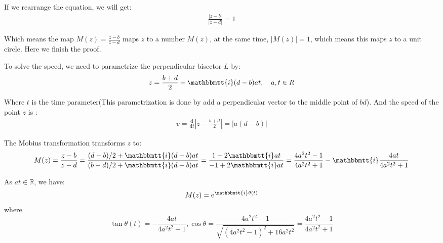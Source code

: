 \documentclass[]{ctexart}
\newcommand{\mi}{\mathbbmtt{i}}
\newcommand{\di}{\mathrm{d}}
\newcommand{\me}{\mathrm{e}}
\begin{document}
		If we rearrange the equation, we will get:
			\begin{equation*}
			\begin{aligned}
				\frac{|z-b|}{|z-d|}=1
			\end{aligned}
			\end{equation*}
			
		Which means the map $M(z)=\frac{z-b}{z-d}$ maps $z$ to a number $M(z)$, at the same time, $|M(z)|=1$, which means this maps $z$ to a unit circle. Here we finish the proof.
		
		To solve the speed, we need to parametrize the perpendicular bisector $L$ by:
		\begin{equation*}
		\begin{aligned}
		z=\frac{b+d}{2}+\mi (d-b)at,\quad a,t\in R
		\end{aligned}
		\end{equation*}
		
		Where $t$ is the time parameter(This parametrization is done by add a perpendicular vector to the middle point of $bd$). And the speed of the point $z$ is :
			\begin{equation*}
			\begin{aligned}
				v=\frac{\di }{\di t}\left|z-\frac{b+d}{2}\right|=|a(d-b)|
			\end{aligned}
			\end{equation*}
		
		The Mobius transformation transforms $z$ to:
			\begin{equation*}
			\begin{aligned}
				M(z)=\frac{z-b}{z-d}=\frac{(d-b)/2+\mi (d-b)at}{(b-d)/2+\mi (d-b)at}=\frac{1+2\mi at}{-1+2\mi at}=\frac{4a^2t^2-1}{4a^2t^2+1}-\mi \frac{4at}{4a^2t^2+1}
			\end{aligned}
			\end{equation*}
		
		As $at\in \mathbb{R}$, we have:
			\begin{equation*}
			\begin{aligned}
				M(z)=\me ^{\mi \theta(t)}
			\end{aligned}
			\end{equation*}
		where
			\begin{equation*}
			\tan \theta(t)=-\frac{4 a t}{4 a^{2} t^{2}-1}, \cos \theta=\frac{4 a^{2} t^{2}-1}{\sqrt{\left(4 a^{2} t^{2}-1\right)^{2}+16 a^{2} t^{2}}}=\frac{4 a^{2} t^{2}-1}{4 a^{2} t^{2}+1}
			\end{equation*}
		
\end{document}
